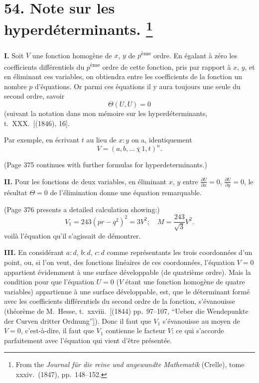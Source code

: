 \documentclass[11pt,a4paper]{article}
\theoremstyle{plain}
\theoremstyle{definition}
\begin{document}
\newpage
\section[Note sur les hyperd\'{e}terminants]{%
54. Note sur les hyperd\'{e}terminants.%
\footnote{From the \textit{Journal f\"{u}r die reine und angewandte Mathematik} (Crelle), tome xxxiv.\ (1847), pp.~148--152.}}

\textbf{I.}
Soit $V$ une fonction homog\`{e}ne de $x$, $y$ de $p$\textsuperscript{\`{e}me} ordre.
En \'{e}galant \`{a} z\'{e}ro les coefficients diff\'{e}rentiels du $p$\textsuperscript{\`{e}me} ordre de
cette fonction, pris par rapport \`{a} $x$, $y$, et en \'{e}liminant ces variables,
on obtiendra entre les coefficients de la fonction un nombre $p$ d'\'{e}quations.
Or parmi ces \'{e}quations il y aura toujours une seule du second ordre, savoir
\[
\Theta(U, U) = 0
\]
(suivant la notation dans mon m\'{e}moire sur les hyperd\'{e}terminants, t.~XXX.\ [(1846), 16].

Par exemple, en \'{e}crivant $t$ au lieu de $x:y$ on a, identiquement
\[
V = (a, b, \ldots \,\overline{\!\!\chi\,} 1, t)^n.
\]

(Page 375 continues with further formulas for hyperdeterminants.)

\textbf{II.}
Pour les fonctions de deux variables, en \'{e}liminant $x$, $y$ entre
$\frac{\partial U}{\partial x} = 0$, $\frac{\partial U}{\partial y} = 0$, le r\'{e}sultat $\Theta = 0$
de l'\'{e}limination donne une \'{e}quation remarquable.

(Page 376 presents a detailed calculation showing:)
\[
V_1 = 243(pr - q^2)^2 = 3V^2; \quad M = \frac{243}{\sqrt{3}} V^2.
\]
voil\`{a} l'\'{e}quation qu'il s'agissait de d\'{e}montrer.

\textbf{III.}
En consid\'erant $a:d$, $b:d$, $c:d$ comme repr\'{e}sentants les trois coordonn\'{e}es
d'un point, ou, si l'on veut, des fonctions lin\'{e}aires de ces coordonn\'{e}es,
l'\'{e}quation $V = 0$ appartient \'{e}videmment \`{a} une surface d\'{e}veloppable
(de quatri\`{e}me ordre). Mais la condition pour que l'\'{e}quation $U = 0$
($V$ \'{e}tant une fonction homog\`{e}ne de quatre variables) appartienne \`{a}
une surface d\'{e}veloppable, est, que le d\'{e}terminant form\'{e} avec les coefficients
diff\'{e}rentiels du second ordre de la fonction, s'\'{e}vanouisse
(th\'{e}or\`{e}me de M.~Hesse, t.~xxviii.\ [(1844) pp.~97--107,
``Ueber die Wendepunkte der Curven dritter Ordnung'']).
Donc il faut que $V_1$ s'\'{e}vanouisse au moyen de $V = 0$, c'est-\`{a}-dire,
il faut que $V_1$ contienne le facteur $V$; ce qui s'accorde parfaitement
avec l'\'{e}quation qui vient d'\^{e}tre pr\'{e}sent\'{e}e.
\end{document}

